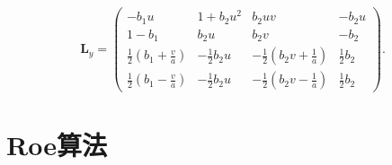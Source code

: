 \documentclass[12pt]{article}
\begin{document}
\begin{equation}
	\bm{L}_{y}=\left(\begin{array}{cccc}
			-b_{1} u                                  & 1+b_{2} u^{2}        & b_{2} u v                                    & -b_{2} u          \\
			1-b_{1}                                   & b_{2} u              & b_{2} v                                      & -b_{2}            \\
			\frac{1}{2}\left(b_{1}+\frac{v}{a}\right) & -\frac{1}{2} b_{2} u & -\frac{1}{2}\left(b_{2} v+\frac{1}{a}\right) & \frac{1}{2} b_{2} \\
			\frac{1}{2}\left(b_{1}-\frac{v}{a}\right) & -\frac{1}{2} b_{2} u & -\frac{1}{2}\left(b_{2} v-\frac{1}{a}\right) & \frac{1}{2} b_{2}
		\end{array}\right).
\end{equation}


\section{Roe算法}
\end{document}
